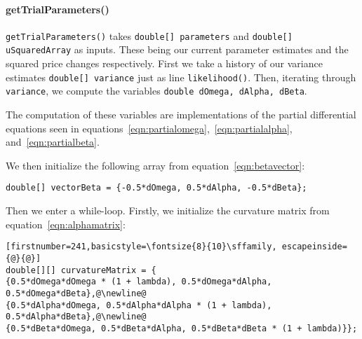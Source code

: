 \documentclass[../Dissertation.tex]{subfiles}
\begin{document}
\paragraph{getTrialParameters()}

\lstinline|getTrialParameters()| takes \lstinline|double[] parameters| and \lstinline|double[] uSquaredArray| as inputs.
These being our current parameter estimates and the squared price changes respectively.
First we take a history of our variance estimates \lstinline|double[] variance| just as line \lstinline|likelihood()|.
Then, iterating through \lstinline|variance|, we compute the variables \lstinline|double dOmega, dAlpha, dBeta|.
\iffalse
	\begin{lstlisting}[firstnumber = 231,basicstyle=\fontsize{8}{10}\sffamily, escapeinside={@}{@}]
	dOmega += ((-1/variance[i]) + (uSquaredArray[i]/Math.pow(variance[i],2)));@\newline@
	dAlpha += (-uSquaredArray[i]/variance[i])@\newline@+ (Math.pow(uSquaredArray[i],2)/Math.pow(variance[i],2));@\newline@
	dBeta 	+= (-variance[i-1]/variance[i])@\newline@+ ((uSquaredArray[i]*variance[i-1])/Math.pow(variance[i],2));
\end{lstlisting}
\fi
The computation of these variables are implementations of the partial differential equations seen in equations~\ref{eqn:partialomega},~\ref{eqn:partialalpha}, and~\ref{eqn:partialbeta}.

We then initialize the following array from equation~\ref{eqn:betavector}:
\begin{lstlisting}[firstnumber = 236]
	double[] vectorBeta = {-0.5*dOmega, 0.5*dAlpha, -0.5*dBeta};
\end{lstlisting}

Then we enter a while-loop.
Firstly, we initialize the curvature matrix from equation~\ref{eqn:alphamatrix}:
\begin{lstlisting}[firstnumber=241,basicstyle=\fontsize{8}{10}\sffamily, escapeinside={@}{@}]
double[][] curvatureMatrix = {
{0.5*dOmega*dOmega * (1 + lambda), 0.5*dOmega*dAlpha, 0.5*dOmega*dBeta},@\newline@
{0.5*dAlpha*dOmega, 0.5*dAlpha*dAlpha * (1 + lambda), 0.5*dAlpha*dBeta},@\newline@
{0.5*dBeta*dOmega, 0.5*dBeta*dAlpha, 0.5*dBeta*dBeta * (1 + lambda)}};
\end{lstlisting}
\end{document}
